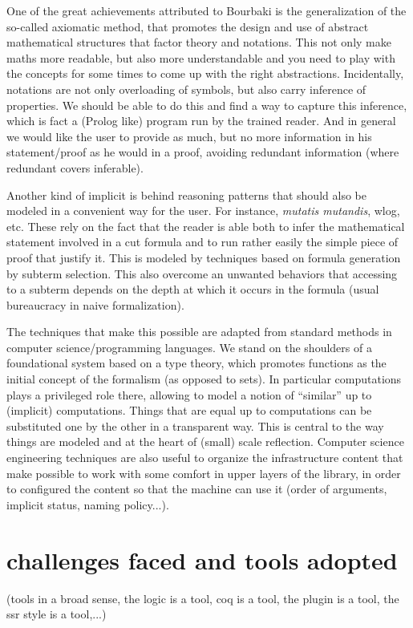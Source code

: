 One of the great achievements attributed to Bourbaki is the
generalization of the so-called axiomatic method, that promotes the
design and use of abstract mathematical structures that factor theory
and notations. This not only make maths more readable, but also more
understandable and you need to play with the concepts for some times
to come up with the right abstractions. Incidentally, notations are
not only overloading of symbols, but also carry inference of
properties. We should be able to do this and find a way to capture this
inference, which is fact a (Prolog like) program run by the trained
reader. And in general we would like the user to provide as much, but
no more information in his statement/proof as he would in a proof,
avoiding redundant information (where redundant covers inferable).

Another kind of implicit is behind reasoning patterns that should also
be modeled in a convenient way for the user. For instance,
\emph{mutatis mutandis}, wlog, etc. These rely on the fact that the
reader is able both to infer the mathematical statement involved in a
cut formula and to run rather easily the simple piece of proof that
justify it. This is modeled by techniques based on formula generation
by subterm selection. This also overcome an unwanted behaviors that
accessing to a subterm depends on the depth at which it occurs in the
formula (usual bureaucracy in naive formalization).

The techniques that make this possible are adapted from standard
methods in computer science/programming languages. We stand on the
shoulders of a foundational system based on a type theory, which
promotes functions as the initial concept of the formalism (as opposed
to sets). In particular computations plays a privileged role there,
allowing to model a notion of ``similar'' up to (implicit)
computations. Things that are equal up to computations can be
substituted one by the other in a transparent way. This is central to
the way things are modeled and at the heart of (small) scale
reflection. Computer science engineering techniques are also useful
to organize the infrastructure content that make possible to work with
some comfort in upper layers of the library, in order to configured
the content so that the machine can use it (order of arguments,
implicit status, naming policy...).





\section{challenges faced and tools adopted}
(tools in a broad sense, the logic is a tool, coq is a tool, the plugin
is a tool, the ssr style is a tool,...)

